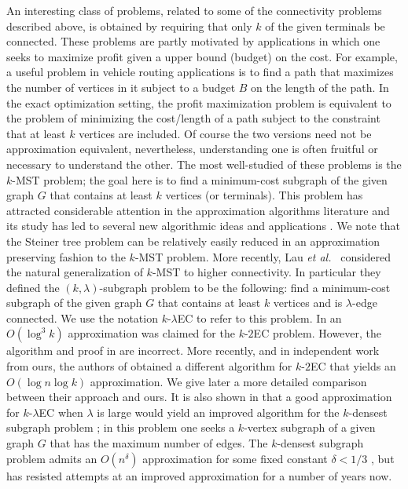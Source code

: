 \documentclass[11pt]{article}
\newcommand{\etal}{{\em et al.}\ }
\newcommand{\kec}[1]{$k$-$#1${\sc EC} }
\newcommand{\ke}{\kec{2}}
\begin{document}
An interesting class of problems, related to some of the connectivity
problems described above, is obtained by requiring that only $k$ of
the given terminals be connected. These problems are partly motivated
by applications in which one seeks to maximize profit given a upper
bound (budget) on the cost.  For example, a useful problem in vehicle
routing applications is to find a path that maximizes the number of
vertices in it subject to a budget $B$ on the length of the path. In
the exact optimization setting, the profit maximization problem is
equivalent to the problem of minimizing the cost/length of a path
subject to the constraint that at least $k$ vertices are included. Of
course the two versions need not be approximation equivalent,
nevertheless, understanding one is often fruitful or necessary to
understand the other. The most well-studied of these problems is the
$k$-MST problem; the goal here is to find a minimum-cost subgraph of
the given graph $G$ that contains at least $k$ vertices (or
terminals). This problem has attracted considerable attention in the
approximation algorithms literature and its study has led to several
new algorithmic ideas and applications
\cite{AwerbuchABV95,Garg96,Garg05,ChaudhuriGRT03,orienteering}.  We
note that the Steiner tree problem can be relatively easily reduced in
an approximation preserving fashion to the $k$-MST problem.  More
recently, Lau \etal \cite{LauNSS07} considered the natural
generalization of $k$-MST to higher connectivity. In particular they
defined the $(k,\lambda)$-subgraph problem to be the following: find a
minimum-cost subgraph of the given graph $G$ that contains at least
$k$ vertices and is $\lambda$-edge connected. We use the notation
\kec{\lambda} to refer to this problem. In \cite{LauNSS07} an
$O(\log^3 k)$ approximation was claimed for the \ke problem.  However,
the algorithm and proof in \cite{LauNSS07} are incorrect.  More
recently, and in independent work from ours, the authors of
\cite{LauNSS07} obtained a different algorithm for \ke that yields an
$O(\log n \log k)$ approximation. We give later a more detailed comparison
between their approach and ours. It is also shown in \cite{LauNSS07}
that a good approximation for \kec{\lambda} when $\lambda$ is large
would yield an improved algorithm for the $k$-densest subgraph problem
\cite{FeigeKP01}; in this problem one seeks a $k$-vertex subgraph of a
given graph $G$ that has the maximum number of edges. The $k$-densest
subgraph problem admits an $O(n^{\delta})$ approximation for some
fixed constant $\delta < 1/3$ \cite{FeigeKP01}, but has resisted
attempts at an improved approximation for a number of years now.
\end{document}
